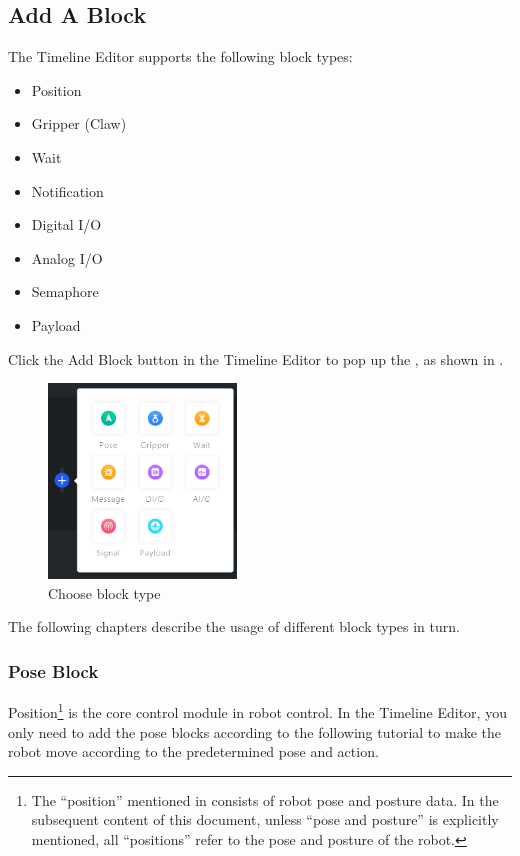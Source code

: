 \subsection{Add A Block}

The Timeline Editor supports the following block types:
\begin{itemize}
\item Position
\item Gripper (Claw)
\item Wait
\item Notification
\item Digital I/O
\item Analog I/O
\item Semaphore
\item Payload
\end{itemize}

Click the Add Block button  in the Timeline Editor to pop up the , as shown in .

\begin{figure}[ht]
	\centering
	\includegraphics[width=5cm]{en/image/3-5.png}
	\caption{Choose block type}
	\label{fig:添加动作块弹出框}
\end{figure}

The following chapters describe the usage of different block types in turn.

\subsubsection{Pose Block}
Position\footnote{The ``position'' mentioned in {\ThisBook} consists of robot pose and posture data. In the subsequent content of this document, unless ``pose and posture'' is explicitly mentioned, all ``positions'' refer to the pose and posture of the robot.} is the core control module in robot control. In the Timeline Editor, you only need to add the pose blocks according to the following tutorial to make the robot move according to the predetermined pose and action.
